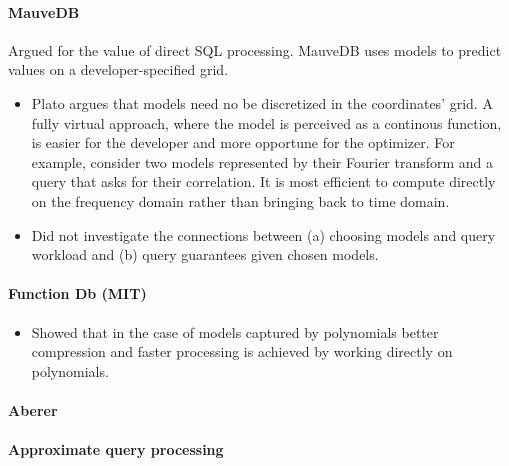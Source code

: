 \paragraph{MauveDB} Argued for the value of direct SQL processing. MauveDB uses models to predict values on a developer-specified grid. 

\begin{itemize}
\item Plato argues that models need no be discretized in the coordinates' grid. A fully virtual approach, where the model is perceived as a continous function, is easier for the developer and more opportune for the optimizer. For example, consider two models represented by their Fourier transform and a query that asks for their correlation. It is most efficient to compute directly on the frequency domain rather than bringing back to time domain.
%
\item Did not investigate the connections between (a) choosing models and query workload and (b) query guarantees given chosen models.
\end{itemize}


\paragraph{Function Db (MIT)} 
\begin{itemize}
\item Showed that in the case of models captured by polynomials better compression and faster processing is achieved by working directly on polynomials.
\end{itemize}


\paragraph{Aberer}


\paragraph{Approximate query processing}
